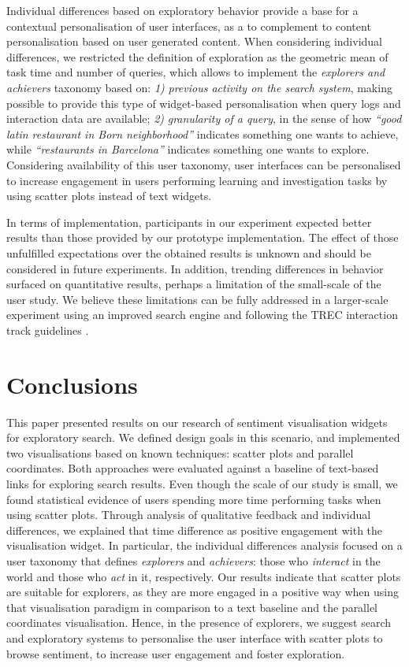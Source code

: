\documentclass{sig-alternate}
\newcommand{\spara}[1]{\smallskip\noindent{\bf #1}}
\begin{document}
\spara{Personalisation of User Interfaces.}
Individual differences based on exploratory behavior provide a base for a contextual personalisation of user interfaces, as a to complement to content personalisation based on user generated content.
When considering individual differences, we restricted the definition of exploration as the geometric mean of task time and number of queries, which allows to implement the \textit{explorers and achievers} taxonomy based on:
\emph{1)} \textit{previous activity on the search system}, making possible to provide this type of widget-based personalisation when query logs and interaction data are available;
\emph{2)} \textit{granularity of a query}, in the sense of how \emph{``good latin restaurant in Born neighborhood''} indicates something one wants to achieve, while \emph{``restaurants in Barcelona''} indicates something one wants to explore.
Considering availability of this user taxonomy, user interfaces can be personalised to increase engagement in users performing learning and investigation tasks by using scatter plots instead of text widgets.


\spara{Limitations.}
In terms of implementation, participants in our experiment expected better results than those provided by our prototype implementation.
The effect of those unfulfilled expectations over the obtained results is unknown and should be considered in future experiments.
In addition, trending differences in behavior surfaced on quantitative results, perhaps a limitation of the small-scale of the user study. 
We believe these limitations can be fully addressed in a larger-scale experiment using an improved search engine and following the TREC interaction track guidelines \cite{dumais2005trec}.


\section{Conclusions}
This paper presented results on our research of sentiment visualisation widgets for exploratory search. 
We defined design goals in this scenario, and implemented two visualisations based on known techniques: scatter plots and parallel coordinates.
Both approaches were evaluated against a baseline of text-based links for exploring search results. 
Even though the scale of our study is small, we found statistical evidence of users spending more time performing tasks when using scatter plots.
Through analysis of qualitative feedback and individual differences, we explained that time difference as positive engagement with the visualisation widget.
In particular, the individual differences analysis focused on a user taxonomy that defines \emph{explorers} and \emph{achievers}: those who \emph{interact} in the world and those who \emph{act} in it, respectively.
Our results indicate that scatter plots are suitable for explorers, as they are more engaged in a positive way when using that visualisation paradigm in comparison to a text baseline and the parallel coordinates visualisation.
Hence, in the presence of explorers, we suggest search and exploratory systems to personalise the user interface with scatter plots to browse sentiment, to increase user engagement and foster exploration.
\end{document}
